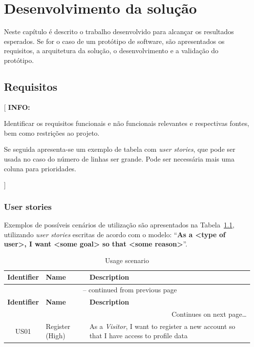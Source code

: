 \documentclass[11pt,a4paper]{report}
\newenvironment{info}[1]{\vspace*{6mm}\color{blue}[ \textbf{INFO:} \begin{em} #1}{\vspace*{3mm}\end{em} ]}
\begin{document}
\chapter{Desenvolvimento da solução}

Neste capítulo é descrito o trabalho desenvolvido para alcançar os
resultados esperados. 
Se for o caso de um protótipo de software, são apresentados os
requisitos, a arquitetura da solução, o desenvolvimento e a validação
do protótipo.

\section{Requisitos}

\begin{info}
Identificar os requisitos funcionais e não funcionais relevantes e respectivas fontes, bem como restrições ao projeto.

Se seguida apresenta-se um exemplo de tabela com \textit{user stories}, que pode ser usada no caso do número de linhas ser grande.
Pode ser necessária mais uma coluna para prioridades.
\end{info}

\subsection*{User stories}

Exemplos de possíveis cenários de utilização são apresentados na Tabela~\ref{tab:userstories}, utilizando \textit{user stories} escritas de acordo com o modelo: 
``\textbf{As a <type of user>, I want <some goal> so that <some reason>}''.

\begin{center}
\begin{longtable}{| c | p{18mm} | p{110mm} |}
\caption{Usage scenario} \label{tab:userstories} \\[-2mm] \hline

\textbf{Identifier} & \textbf{Name} & \textbf{Description} \\ \hline\hline
\endfirsthead

\multicolumn{3}{c}{{\tablename\ \thetable{} -- continued from previous page}} \\[2mm] \hline
\textbf{Identifier} & \textbf{Name} & \textbf{Description} \\ \hline\hline
\endhead

\multicolumn{3}{r}{{Continues on next page\ldots}} \\
\endfoot

\hline
\endlastfoot

US01 & Register (High) & As a \textit{Visitor}, I want to register a new account so that I have access to profile data  \\ \hline

% 

\end{longtable}
\end{center}
\end{document}
